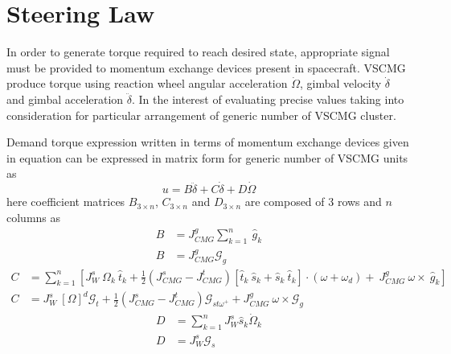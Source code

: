 \section{Steering Law}
In order to generate torque required to reach desired state, appropriate signal must be provided to momentum exchange devices present in spacecraft. VSCMG produce torque using reaction wheel angular acceleration $\displaystyle \dot{\Omega }$, gimbal velocity $\displaystyle \dot{\delta }$ and gimbal acceleration $\displaystyle \ddot{\delta }$. In the interest of evaluating precise values taking into consideration for particular arrangement of generic number of VSCMG cluster.

Demand torque expression written in terms of momentum exchange devices given in equation can be expressed in matrix form for generic number of VSCMG units as
\begin{equation}
u=B\ddot{\delta } +C\dot{\delta } +D\dot{\Omega }
\label{eqn:steering_controller}
\end{equation}
here coefficient matrices $\displaystyle B_{3\times n}$, $\displaystyle C_{3\times n}$ and $\displaystyle D_{3\times n}$ are composed of 3 rows and $\displaystyle n$ columns as
\begin{equation}
\begin{aligned}
B & =J^{g}_{CMG}\sum ^{n}_{k=1} \ \hat{g}_{k}\\
B & =J^{g}_{CMG}\mathcal{G}_{g}
\end{aligned}
\end{equation}
\begin{equation}
\begin{aligned}
C & =\sum ^{n}_{k=1}\left[ J^{s}_{W} \ \Omega _{k} \ \hat{t}_{k} +\frac{1}{2}\left( J^{s}_{CMG} -J^{t}_{CMG}\right)[\hat{t}_{k} \ \hat{s}_{k} +\hat{s}_{k} \ \hat{t}_{k}] \cdotp ( \omega +\omega _{d}) +\ J^{g}_{CMG} \ \omega \times \ \hat{g}_{k}\right]\\
C & =J^{s}_{W} \ [ \Omega ]^{d}\mathcal{G}_{t} +\frac{1}{2}\left( J^{s}_{CMG} -J^{t}_{CMG}\right)\mathcal{G}_{st\omega ^{+}} +J^{g}_{CMG} \ \omega \times \mathcal{G}_{g}
\end{aligned}
\label{eqn:steerC_full}
\end{equation}
\begin{equation}
\begin{aligned}
D & =\sum ^{n}_{k=1} J^{s}_{W}\hat{s}_{k}\dot{\Omega }_{k}\\
D & =J^{s}_{W}\mathcal{G}_{s}
\end{aligned}
\end{equation}
